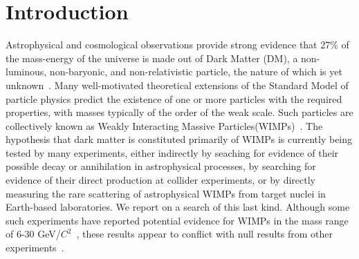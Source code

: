 \section{Introduction}

Astrophysical and cosmological observations provide strong evidence that 27\% of the mass-energy of the universe is made out of Dark Matter (DM), a non-luminous, non-baryonic, and non-relativistic particle, the nature of which is yet unknown~\cite{Harvey1462}. Many well-motivated theoretical extensions of the Standard Model of particle physics predict the existence of one or more particles with the required properties, with masses typically of the order of the weak scale. Such particles are collectively known as Weakly Interacting Massive Particles(WIMPs)~\cite{Bertone:2010zza}. The hypothesis that dark matter is constituted primarily of WIMPs is currently being tested by many experiments, either indirectly by seaching for evidence of their possible decay or annihilation in astrophysical processes, by searching for evidence of their direct production at collider experiments, or by directly measuring the rare scattering of astrophysical WIMPs from target nuclei in Earth-based laboratories. We report on a search of this last kind. Although some such experiments have reported potential evidence for WIMPs in the mass range of 6-30 GeV/$C^2$~\cite{DAMA,COGENT,CDMSlite,CREST}, these results appear to conflict with null results from other experiments~\cite{xe100_run_combination,PANDAX,LUXnew}.

